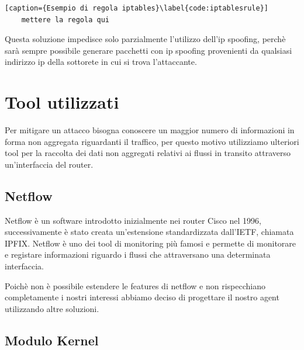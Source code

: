 \begin{lstlisting}[caption={Esempio di regola iptables}\label{code:iptablesrule}]
    mettere la regola qui
\end{lstlisting}
Questa soluzione impedisce solo parzialmente l'utilizzo dell'ip spoofing, perchè sarà sempre possibile generare pacchetti con ip spoofing provenienti da qualsiasi indirizzo ip della sottorete in cui si trova l'attaccante.


\section{Tool utilizzati}

Per mitigare un attacco bisogna conoscere un maggior numero di informazioni in forma non aggregata riguardanti il traffico, per questo motivo utilizziamo ulteriori tool per la raccolta dei dati non aggregati relativi ai flussi in transito attraverso un'interfaccia del router.

\subsection{Netflow}

Netflow è un software introdotto inizialmente nei router Cisco nel 1996, successivamente è stato creata un'estensione standardizzata dall'IETF, chiamata IPFIX. Netflow è uno dei tool di monitoring più famosi e permette di monitorare e registare informazioni riguardo i flussi che attraversano una determinata interfaccia.





Poichè non è possibile estendere le features di netflow e non rispecchiano completamente i nostri interessi abbiamo deciso di progettare il nostro agent utilizzando altre soluzioni.

\subsection{Modulo Kernel}


